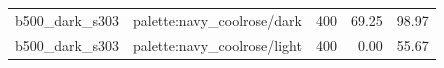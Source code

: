 \begin{longtable}{l>{\raggedright\arraybackslash}p{.42\linewidth}rrr}
b500\_\allowbreak{}dark\_\allowbreak{}s303 & %
palette:navy\_\allowbreak{}coolrose/dark & %
400 & %
69.25 & %
98.97 \\ %

b500\_\allowbreak{}dark\_\allowbreak{}s303 & %
palette:navy\_\allowbreak{}coolrose/light & %
400 & %
0.00 & %
55.67 \\ %


\end{longtable}
